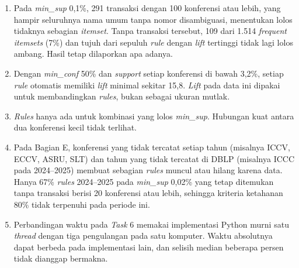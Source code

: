 \begin{enumerate}
\item Pada \textit{min\_sup} 0,1\%, 291 transaksi dengan 100 konferensi atau lebih, yang hampir seluruhnya nama umum tanpa nomor disambiguasi, menentukan lolos tidaknya sebagian \textit{itemset}. Tanpa transaksi tersebut, 109 dari 1.514 \textit{frequent itemsets} (7\%) dan tujuh dari sepuluh \textit{rule} dengan \textit{lift} tertinggi tidak lagi lolos ambang. Hasil tetap dilaporkan apa adanya.
\item Dengan \textit{min\_conf} 50\% dan \textit{support} setiap konferensi di bawah 3,2\%, setiap \textit{rule} otomatis memiliki \textit{lift} minimal sekitar 15,8. \textit{Lift} pada data ini dipakai untuk membandingkan \textit{rules}, bukan sebagai ukuran mutlak.
\item \textit{Rules} hanya ada untuk kombinasi yang lolos \textit{min\_sup}. Hubungan kuat antara dua konferensi kecil tidak terlihat.
\item Pada Bagian E, konferensi yang tidak tercatat setiap tahun (misalnya ICCV, ECCV, ASRU, SLT) dan tahun yang tidak tercatat di DBLP (misalnya ICCC pada 2024--2025) membuat sebagian \textit{rules} muncul atau hilang karena data. Hanya 67\% \textit{rules} 2024--2025 pada \textit{min\_sup} 0,02\% yang tetap ditemukan tanpa transaksi berisi 20 konferensi atau lebih, sehingga kriteria ketahanan 80\% tidak terpenuhi pada periode ini.
\item Perbandingan waktu pada \textit{Task} 6 memakai implementasi Python murni satu \textit{thread} dengan tiga pengulangan pada satu komputer. Waktu absolutnya dapat berbeda pada implementasi lain, dan selisih median beberapa persen tidak dianggap bermakna.
\end{enumerate}
